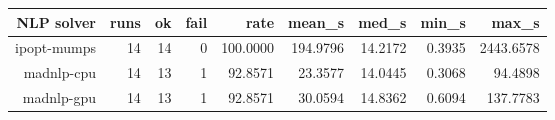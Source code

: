 {\footnotesize
\begin{longtable}{|r|r|r|r|r|r|r|r|r|}
  \hline
  \textbf{NLP solver} & \textbf{runs} & \textbf{ok} & \textbf{fail} & \textbf{rate} & \textbf{mean\_s} & \textbf{med\_s} & \textbf{min\_s} & \textbf{max\_s} \\
  \hline
  ipopt-mumps & 14 & 14 & 0 & 100.0000 & 194.9796 & 14.2172 & 0.3935 & 2443.6578 \\
  madnlp-cpu & 14 & 13 & 1 & 92.8571 & 23.3577 & 14.0445 & 0.3068 & 94.4898 \\
  madnlp-gpu & 14 & 13 & 1 & 92.8571 & 30.0594 & 14.8362 & 0.6094 & 137.7783 \\
  \hline
\end{longtable}
}
